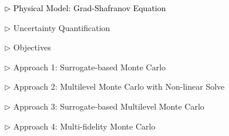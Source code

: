 \documentclass{beamer}
\begin{document}
\begin{frame}[c]
\large 	
\textcolor{mygray1}{
    \begin{itemize}[leftmargin=5pt] 
        \item[\textcolor{black}{$\triangleright$}] \textcolor{black}{\fontsize{25}{60}\selectfont Physical Model: Grad-Shafranov Equation}
        \vspace{0.2cm}	
        \item[$\triangleright$] Uncertainty Quantification
        \vspace{0.2cm}
        \item[$\triangleright$] Objectives
        \vspace{0.2cm}
        \item[$\triangleright$] Approach 1: Surrogate-based Monte Carlo
        \vspace{0.2cm}
        \item[$\triangleright$] Approach 2: Multilevel Monte Carlo with Non-linear Solve
        \vspace{0.2cm}
        \item[$\triangleright$] Approach 3: Surrogate-based Multilevel Monte Carlo
        \vspace{0.2cm}
        \item[$\triangleright$] Approach 4: Multi-fidelity Monte Carlo
    \end{itemize}
}
\end{frame}
\end{document}
